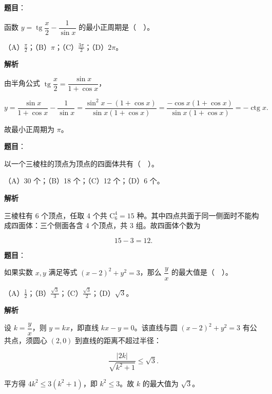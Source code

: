 \begin{answer}

\textbf{题目}：

函数 $y=\operatorname{tg}\dfrac{x}{2}-\dfrac{1}{\sin x}$ 的最小正周期是（　）。

（A）$\frac{\pi}{2}$；（B）$\pi$；（C）$\frac{3\pi}{2}$；（D）$2\pi$。

\textbf{解析}

由半角公式 $\operatorname{tg}\dfrac{x}{2}=\dfrac{\sin x}{1+\cos x}$，

\nopagebreak[4]
\[
y=\frac{\sin x}{1+\cos x}-\frac{1}{\sin x}
=\frac{\sin^2x-(1+\cos x)}{\sin x(1+\cos x)}
=\frac{-\cos x(1+\cos x)}{\sin x(1+\cos x)}
=-\operatorname{ctg}x.
\]

故最小正周期为 $\pi$。


\end{answer}
\begin{answer}

\textbf{题目}：

以一个三棱柱的顶点为顶点的四面体共有（　）。

（A）30 个；（B）18 个；（C）12 个；（D）6 个。

\textbf{解析}

三棱柱有 6 个顶点，任取 4 个共 $\mathrm{C}_6^4=15$ 种。其中四点共面于同一侧面时不能构成四面体：三个侧面各含 4 个顶点，共 3 组。故四面体个数为

\nopagebreak[4]
\[
15-3=12.
\]


\end{answer}
\begin{answer}

\textbf{题目}：

如果实数 $x,y$ 满足等式 $(x-2)^2+y^2=3$，那么 $\dfrac{y}{x}$ 的最大值是（　）。

（A）$\frac12$；（B）$\frac{\sqrt3}{3}$；（C）$\frac{\sqrt3}{2}$；（D）$\sqrt3$。

\textbf{解析}

设 $k=\dfrac{y}{x}$，则 $y=kx$，即直线 $kx-y=0$。该直线与圆 $(x-2)^2+y^2=3$ 有公共点，须圆心 $(2,0)$ 到直线的距离不超过半径：

\nopagebreak[4]
\[
\frac{|2k|}{\sqrt{k^2+1}}\le\sqrt3.
\]

平方得 $4k^2\le 3(k^2+1)$，即 $k^2\le 3$。故 $k$ 的最大值为 $\sqrt3$。


\end{answer}

